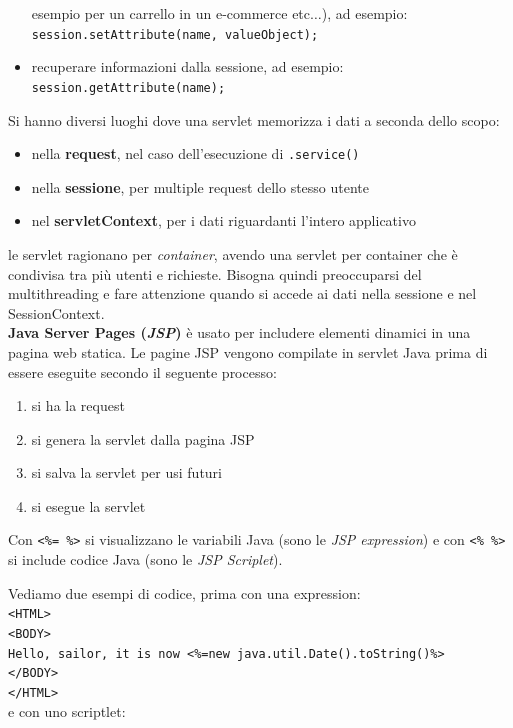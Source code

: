 \documentclass[a4paper,12pt, oneside]{book}
\begin{document}
\begin{shaded}
\begin{itemize}
    esempio per un carrello in un e-commerce etc$\ldots$), ad esempio:\\
    \texttt{session.setAttribute(name, valueObject);}
    \item recuperare informazioni dalla sessione, ad esempio:
    \texttt{session.getAttribute(name);}
  \end{itemize}
  Si hanno diversi luoghi dove una servlet memorizza i dati a seconda dello
  scopo:
  \begin{itemize}
    \item nella \textbf{request}, nel caso dell'esecuzione di
    \texttt{.service()}
    \item nella \textbf{sessione}, per multiple request dello stesso utente
    \item nel \textbf{servletContext}, per i dati riguardanti l'intero
    applicativo 
  \end{itemize}
  le servlet ragionano per \textit{container}, avendo una servlet per container
  che è condivisa tra più utenti e richieste. Bisogna quindi preoccuparsi del
  multithreading e fare attenzione quando si accede ai dati nella sessione e nel
  SessionContext. \\
  \textbf{Java Server Pages (\textit{JSP})} è usato per includere elementi
  dinamici in una pagina web statica. Le pagine JSP vengono compilate in servlet
  Java prima di essere eseguite secondo il seguente processo:
  \begin{enumerate}
    \item si ha la request
    \item si genera la servlet dalla pagina JSP
    \item si salva la servlet per usi futuri
    \item si esegue la servlet
  \end{enumerate}
  Con \texttt{<\%= \%>} si visualizzano le variabili Java (sono le \textit{JSP
    expression}) e con \texttt{<\% \%>} si include codice Java (sono le
  \textit{JSP Scriplet}).
  \begin{esempio}
    Vediamo due esempi di codice, prima con una expression:\\
    \texttt{<HTML>\\
      <BODY>\\
      Hello, sailor, it is now <\%=new java.util.Date().toString()\%>\\
      </BODY>\\
      </HTML>}
    \\
    e con uno scriptlet:\\

\end{esempio}
\end{shaded}
\end{document}
